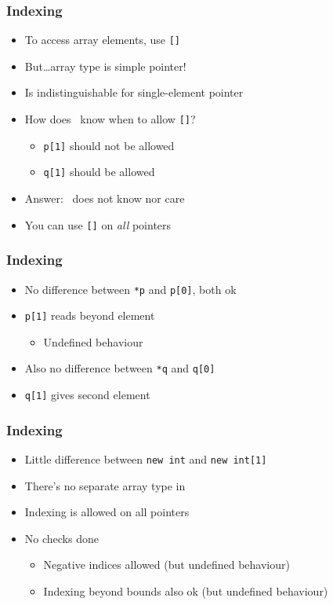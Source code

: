 \begin{frame}
  \frametitle{Indexing}
  \begin{itemize}
    \item To access array elements, use \texttt{[]}
    \item But\dots array type is simple pointer!
    \item Is indistinguishable for single-element pointer
    \item How does \cpp\ know when to allow \texttt{[]}?
          \begin{itemize}
            \item \texttt{p[1]} should not be allowed
            \item \texttt{q[1]} should be allowed
          \end{itemize}
    \item Answer: \cpp\ does not know nor care
    \item You can use \texttt{[]} on \emph{all} pointers
  \end{itemize}
\end{frame}

\begin{frame}
  \frametitle{Indexing}
  \begin{itemize}
    \item No difference between \texttt{*p} and \texttt{p[0]}, both ok
    \item \texttt{p[1]} reads beyond element
          \begin{itemize}
            \item Undefined behaviour
          \end{itemize}
  \end{itemize}
  \vskip5mm
  \begin{itemize}
    \item Also no difference between \texttt{*q} and \texttt{q[0]}
    \item \texttt{q[1]} gives second element
  \end{itemize}
\end{frame}

\begin{frame}
  \frametitle{Indexing}
  \begin{itemize}
    \item Little difference between \texttt{new int} and \texttt{new int[1]}
    \item There's no separate array type in \cpp
    \item Indexing is allowed on all pointers
    \item No checks done
          \begin{itemize}
            \item Negative indices allowed (but undefined behaviour)
            \item Indexing beyond bounds also ok (but undefined behaviour)
          \end{itemize}
  \end{itemize}
\end{frame}

